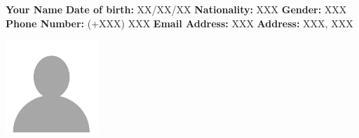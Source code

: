 \documentclass{report} %
\begin{document}
\thispagestyle{empty} %


\noindent
\begin{minipage}{0.5\textwidth}
    \huge \textbf{Your Name} 
    \vspace{3mm} %
    \small \newline \textbf{Date of birth:} XX/XX/XX
    \small \newline \textbf{Nationality:} XXX
    \small \newline \textbf{Gender:} XXX
    \small \newline \textbf{Phone Number:} (+XXX) XXX 
    \small \newline \textbf{Email Address:} XXX 
    \small \newline \textbf{Address:} XXX, XXX %
\end{minipage}
    \hspace{0.05\textwidth}
\begin{minipage}{0.4\textwidth}
    \raggedleft %
    \includegraphics[width=3.5cm]{profile} 
\end{minipage}

\end{document}
